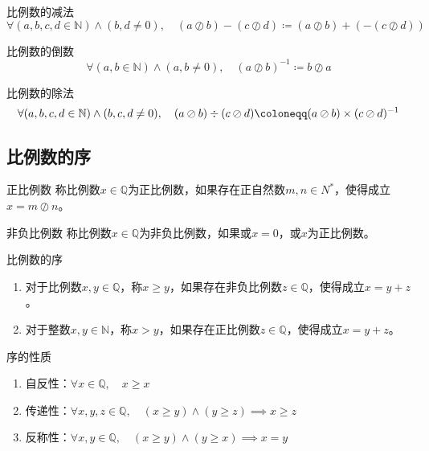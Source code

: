 \documentclass[lang = cn, scheme = chinese, thmcnt = section]{elegantbook}
\newcommand{\N}{\mathbb{N}}            %
\newcommand{\Q}{\mathbb{Q}}            %
\begin{document}
\begin{definition}{比例数的减法}
	$$
	\forall (a,b,c,d\in\N)\wedge (b,d\ne 0),\quad 
	(a \oslash b)-(c \oslash d)\coloneqq (a \oslash b)+(-(c \oslash d))
	$$
\end{definition}

\begin{definition}{比例数的倒数}
	$$
	\forall (a,b\in\N)\wedge (a,b\ne 0),\quad 
	(a\oslash b)^{-1}\coloneqq b \oslash a
	$$
\end{definition}

\begin{definition}{比例数的除法}
	$$
	\forall (a,b,c,d\in\N)\wedge (b,c,d\ne 0),\quad 
	(a \oslash b)\divisionsymbol (c \oslash d)\coloneqq 
	(a \oslash b)\times (c \oslash d)^{-1}
	$$
\end{definition}

\subsection{比例数的序}

\begin{definition}{正比例数}
	称比例数$x\in\Q$为正比例数，如果存在正自然数$m,n\in N^*$，使得成立$x=m \oslash n$。
\end{definition}

\begin{definition}{非负比例数}
	称比例数$x\in\Q$为非负比例数，如果或$x=0$，或$x$为正比例数。
\end{definition}

\begin{definition}{比例数的序}
	\begin{enumerate}
		\item 对于比例数$x,y\in\Q$，称$x \ge y$，如果存在非负比例数$z\in\Q$，使得成立$x=y+z$。
		\item 对于整数$x,y\in\N$，称$x>y$，如果存在正比例数$z\in\Q$，使得成立$x=y+z$。
	\end{enumerate}
\end{definition}

\begin{proposition}{序的性质}
	\begin{enumerate}
		\item 自反性：$\forall x\in\Q,\quad x \ge x$
		\item 传递性：$\forall x,y,z\in\Q,\quad (x\ge y)\wedge(y\ge z)\implies x\ge z$
		\item 反称性：$\forall x,y\in\Q,\quad (x\ge y)\wedge(y\ge x)\implies x=y$
	\end{enumerate}
\end{proposition}
\end{document}
